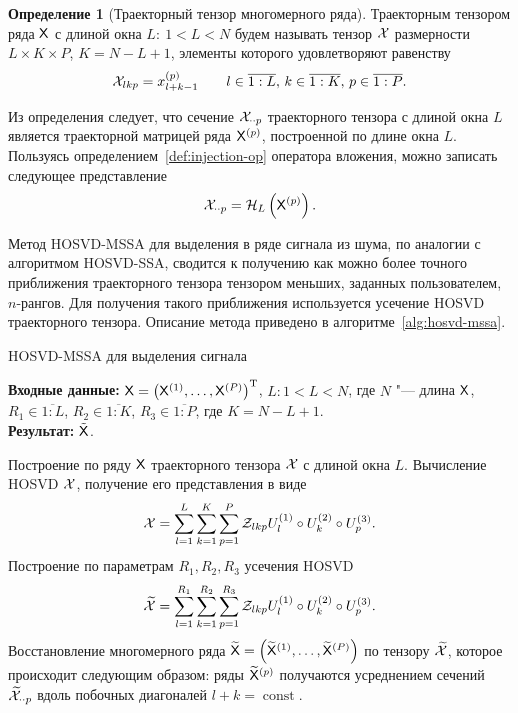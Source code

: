 \documentclass[specialist,
    substylefile=spbu.rtx,
    subf,href,colorlinks=true, 12pt]{disser}
\theoremstyle{plain}
\theoremstyle{definition}
\newtheorem{definition}{Определение}[section]
\theoremstyle{remark}
\newcommand{\Input}{\textbf{Входные данные: }}
\newcommand{\Output}{\textbf{Результат: }}
\begin{document}
    \begin{definition}[Траекторный тензор многомерного ряда]
        \label{def:trajectory-tensor-mssa}
        Траекторным тензором ряда $\mathsf{X}$ с длиной окна $L:\: 1< L < N$ будем называть тензор $\mathcal{X}$
        размерности ${L \times K \times P}$, ${K = N - L + 1}$, элементы которого удовлетворяют равенству
        \[
            \mathcal{X}_{lkp}=x_{l+k-1}^{(p)} \qquad l \in \overline{1:L},\, k \in \overline{1:K},\, p \in \overline{1:P}.
        \]
    \end{definition}

    Из определения следует, что сечение $\mathcal{X}_{\cdot \cdot p}$ траекторного тензора с длиной окна $L$
    является траекторной матрицей ряда $\mathsf{X}^{(p)}$, построенной по длине окна $L$.
    Пользуясь определением~\ref{def:injection-op} оператора вложения, можно записать следующее представление
    \[
        \mathcal{X}_{\cdot \cdot p} = \mathcal{H}_L \left(\mathsf{X}^{(p)}\right).
    \]

    Метод HOSVD-MSSA для выделения в ряде сигнала из шума, по аналогии с алгоритмом HOSVD-SSA,
    сводится к получению как можно более точного приближения траекторного тензора тензором меньших,
    заданных пользователем, $n$-рангов.
    Для получения такого приближения используется усечение HOSVD траекторного тензора.
    Описание метода приведено в алгоритме~\ref{alg:hosvd-mssa}.

    \begin{algorithm}[!ht]
        \caption{HOSVD-MSSA для выделения сигнала}
        \label{alg:hosvd-mssa}
        \Input $\mathsf{X} = \left(\mathsf{X}^{(1)}, \ldots, \mathsf{X}^{(P)}\right)^{\mathrm{T}}$,
        $L: 1< L < N$, где $N$ "--- длина $\mathsf{X}$, $R_1 \in \overline{1:L}$,
        $R_2 \in \overline{1:K}$, $R_3 \in \overline{1:P}$, где $K = N-L+1$.\\
        \Output $\tilde{\mathsf{X}}$.
        \begin{algorithmic}[1]
            \State Построение по ряду $\mathsf{X}$ траекторного тензора $\mathcal{X}$ с длиной окна $L$.
            \State Вычисление HOSVD $\mathcal{X}$, получение его представления в виде
            \begin{equation}
                \mathcal{X} = \sum_{l=1}^{L} \sum_{k=1}^{K} \sum_{p=1}^{P} \mathcal{Z}_{lkp} U_l^{(1)}\circ U_k^{(2)} \circ U_p^{(3)}.
                \label{eq:hosvd-mssa}
            \end{equation}
            \State Построение по параметрам $R_1, R_2, R_3$ усечения HOSVD
            \[
                \widetilde{\mathcal{X}}=\sum_{l=1}^{R_1} \sum_{k=1}^{R_2} \sum_{p=1}^{R_3} \mathcal{Z}_{lkp} U_l^{(1)}\circ U_k^{(2)} \circ U_p^{(3)}.
            \]
            \State \label{step:hosvd-mssa-sep-restoration} Восстановление многомерного ряда $\widetilde{\mathsf{X}}=\left(\widetilde{\mathsf{X}}^{(1)}, \ldots, \widetilde{\mathsf{X}}^{(P)}\right)$ по тензору
            $\widetilde{\mathcal{X}}$, которое происходит следующим образом:
            ряды $\widetilde{\mathsf{X}}^{(p)}$ получаются усреднением сечений $\widetilde{\mathcal{X}}_{\cdot \cdot p}$ вдоль
            побочных диагоналей $l+k=\operatorname{const}$.
        \end{algorithmic}
    \end{algorithm}
\end{document}
